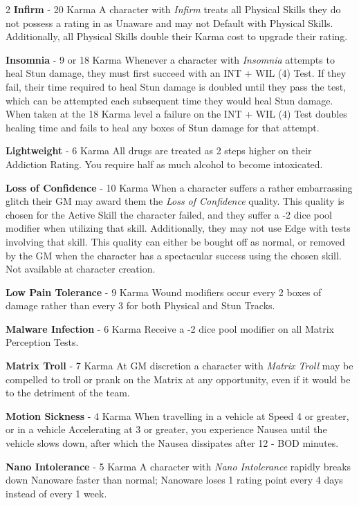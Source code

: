 \documentclass[
  oneside]{article}
\begin{document}
\begin{multicols}{2}
\textbf{Infirm} - 20 Karma A character with
\emph{Infirm} treats all Physical Skills they do
not possess a rating in as Unaware and may not
Default with Physical Skills. Additionally, all
Physical Skills double their Karma cost to upgrade
their rating.

\textbf{Insomnia} - 9 or 18 Karma Whenever a
character with \emph{Insomnia} attempts to heal
Stun damage, they must first succeed with an INT +
WIL (4) Test. If they fail, their time required to
heal Stun damage is doubled until they pass the
test, which can be attempted each subsequent time
they would heal Stun damage. When taken at the 18
Karma level a failure on the INT + WIL (4) Test
doubles healing time and fails to heal any boxes
of Stun damage for that attempt.

\textbf{Lightweight} - 6 Karma All drugs are
treated as 2 steps higher on their Addiction
Rating. You require half as much alcohol to become
intoxicated.

\textbf{Loss of Confidence} - 10 Karma When a
character suffers a rather embarrassing glitch
their GM may award them the \emph{Loss of
Confidence} quality. This quality is chosen for
the Active Skill the character failed, and they
suffer a -2 dice pool modifier when utilizing that
skill. Additionally, they may not use Edge with
tests involving that skill. This quality can
either be bought off as normal, or removed by the
GM when the character has a spectacular success
using the chosen skill. Not available at character
creation.

\textbf{Low Pain Tolerance} - 9 Karma Wound
modifiers occur every 2 boxes of damage rather
than every 3 for both Physical and Stun Tracks.

\textbf{Malware Infection} - 6 Karma Receive a -2
dice pool modifier on all Matrix Perception Tests.

\textbf{Matrix Troll} - 7 Karma At GM discretion a
character with \emph{Matrix Troll} may be
compelled to troll or prank on the Matrix at any
opportunity, even if it would be to the detriment
of the team.

\textbf{Motion Sickness} - 4 Karma When travelling
in a vehicle at Speed 4 or greater, or in a
vehicle Accelerating at 3 or greater, you
experience Nausea until the vehicle slows down,
after which the Nausea dissipates after 12 - BOD
minutes.

\textbf{Nano Intolerance} - 5 Karma A character
with \emph{Nano Intolerance} rapidly breaks down
Nanoware faster than normal; Nanoware loses 1
rating point every 4 days instead of every 1 week.


\end{multicols}
\end{document}
